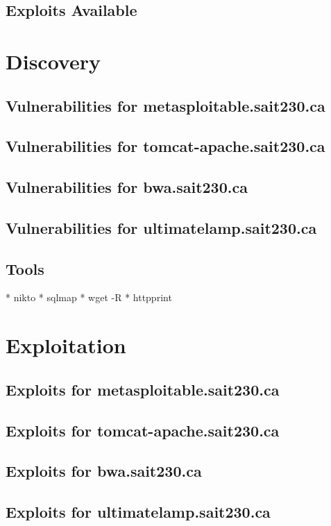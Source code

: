 \documentclass{article}
\begin{document}
\subsection{Exploits Available}

\newpage
\section{Discovery}
\subsection{Vulnerabilities for metasploitable.sait230.ca}
\subsection{Vulnerabilities for tomcat-apache.sait230.ca}
\subsection{Vulnerabilities for bwa.sait230.ca}
\subsection{Vulnerabilities for ultimatelamp.sait230.ca}
\subsection{Tools}

* nikto
* sqlmap
* wget -R
* httpprint

\newpage
\section{Exploitation}
\subsection{Exploits for metasploitable.sait230.ca}
\subsection{Exploits for tomcat-apache.sait230.ca}
\subsection{Exploits for bwa.sait230.ca}
\subsection{Exploits for ultimatelamp.sait230.ca}
\end{document}
